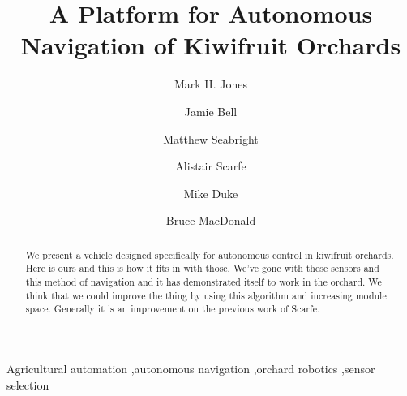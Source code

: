 \documentclass[preprint,authoryear,12pt]{elsarticle}
\begin{document}
\begin{frontmatter}



\title{A Platform for Autonomous Navigation of Kiwifruit Orchards}



\author[UoW]{Mark H. Jones}

\author[UoA]{Jamie Bell}
\author[UoW]{Matthew Seabright}
\author[RPL]{Alistair Scarfe}
\author[UoW]{Mike Duke}
\author[UoA]{Bruce MacDonald}

\address[UoW]{School of Engineering, University of Waikato, Hamilton, New Zealand}
\address[UoA]{Faculty of Engineering, University of Auckland, Auckland, New Zealand}
\address[RPL]{Robotics Plus Ltd, Newnham Innovation Park, Tauranga, New Zealand}

\begin{abstract}

    We present a vehicle designed specifically for autonomous control in kiwifruit orchards.
    Here is ours and this is how it fits in with those.
    We've gone with these sensors and this method of navigation and it has demonstrated itself to work in the orchard.
    We think that we could improve the thing by using this algorithm and increasing module space.
    Generally it is an improvement on the previous work of Scarfe.

\end{abstract}

\begin{keyword}

    Agricultural automation \sep autonomous navigation \sep orchard robotics \sep sensor selection
\end{keyword}

\end{frontmatter}
\end{document}

